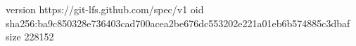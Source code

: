 version https://git-lfs.github.com/spec/v1
oid sha256:ba9c850328e736403cad700acea2be676dc553202e221a01eb6b574885c3dbaf
size 228152
